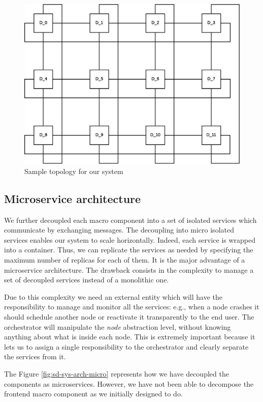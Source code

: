 \begin{figure}[H]
  \centering
  \includegraphics[scale=0.5,keepaspectratio]
    {images/solution/topology.eps}
  \caption{Sample topology for our system}
  \label{fig:sd-sys-arch-topology}
\end{figure}


\subsection{Microservice architecture}

We further decoupled each macro component into a set of isolated services
which communicate by exchanging messages. The decoupling into micro isolated
services enables our system to scale horizontally. Indeed, each service is wrapped
into a container. Thus, we can replicate
the services as needed by specifying the maximum number of replicas
for each of them.
It is the major advantage
of a microservice architecture.
The drawback consists in the complexity to manage a set of decoupled
services instead of a monolithic one.


Due to this complexity
we need an external entity which
will have the responsibility to manage and monitor all the services:
e.g., when a node crashes it should schedule another node or reactivate it
transparently to the end user.
The orchestrator will
manipulate the \textit{node} abstraction level, without knowing anything about
what is inside each node. This is extremely important because it
lets us to assign
a single responsibility to the orchestrator and clearly
separate the services from it.


The Figure \ref{fig:sd-sys-arch-micro} represents how we have decoupled
the components as microservices. However, we have not been able to decompose the
frontend macro component as we initially designed to do.

